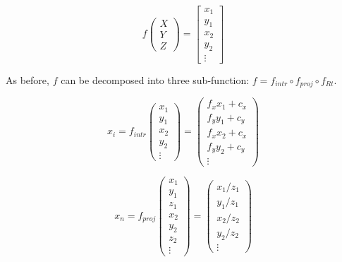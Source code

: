 \begin{equation}
    f\left(\begin{array}{c}
        X \\ Y \\ Z
    \end{array}\right) = 
    \left[\begin{array}{c}
        x_1 \\ y_1 \\ x_2 \\ y_2 \\ \vdots
    \end{array}\right]
\end{equation}

As before, $f$ can be decomposed into three sub-function: $f = f_{intr} \circ f_{proj} \circ f_{Rt}$.


\begin{equation}
    x_i = f_{intr}\left(\begin{array}{c}
        x_1 \\ y_1 \\ x_2 \\ y_2 \\ \vdots \end{array}\right) = 
        \left(\begin{array}{c}
            f_x x_1 + c_x \\
            f_y y_1 + c_y \\
            f_x x_2 + c_x \\
            f_y y_2 + c_y \\
            \vdots
        \end{array}\right)
\end{equation}

\begin{equation}
    x_n = f_{proj}\left(\begin{array}{c}
        x_1 \\ y_1 \\ z_1 \\
        x_2 \\ y_2 \\ z_2 \\ \vdots \end{array}\right) = 
        \left(\begin{array}{c}
            x_1 / z_1 \\ y_1 / z_1 \\
            x_2 / z_2 \\ y_2 / z_2 \\ 
            \vdots
        \end{array}\right)
\end{equation}

